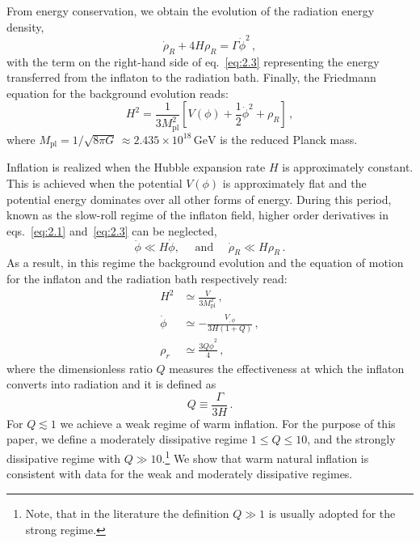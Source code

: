\documentclass[a4paper,11pt]{article}
\begin{document}
From energy conservation, we obtain the evolution of the radiation energy density,
\begin{equation}
    \Dot{\rho}_R+4H\rho_R=\Gamma \Dot{\phi}^2\,,  \label{eq:2.3}
\end{equation}
with the term on the right-hand side of eq.~\eqref{eq:2.3} representing the energy transferred from the inflaton to the radiation bath.
Finally, the Friedmann equation for the background evolution reads:
\begin{equation}
    H^2=\frac{1}{3M_{\mathrm{pl}}^2}\left[V(\phi)+\frac{1}{2}\Dot{\phi}^2+\rho_R\right]\,,  \label{eq:2.4}
\end{equation}
where $M_{\mathrm{pl}} = 1/\sqrt{8 \pi G} \, \approx 2.435\times 10^{18}\,\mathrm{GeV}$ is the reduced Planck mass.

Inflation is realized when the Hubble expansion rate $H$ is approximately constant. This is achieved when the potential $V(\phi)$ is approximately flat and the potential energy dominates over all other forms of energy. During this period, known as the slow-roll regime of the inflaton field, higher order derivatives in eqs.~\eqref{eq:2.1} and~\eqref{eq:2.3} can be neglected,
\begin{equation}
    \ddot{\phi} \ll H \dot{\phi}, \quad \text { and } \quad \dot{\rho}_{R} \ll H \rho_{R}\,. \label{eq:2.5}
\end{equation}
As a result, in this regime the background evolution and the equation of motion for the inflaton and the radiation bath respectively read:
\begin{align}
    H^2&\simeq \frac{V}{3M_{\mathrm{pl}}^2}\,, \label{eq:SR1} \\
    \Dot{\phi}&\simeq -\frac{V_{,\phi}}{3H(1+Q)}\,, \label{eq:SR2}\\
    \rho_r&\simeq \frac{3Q \Dot{\phi}^2}{4}\,,\label{eq:SR3}
\end{align}
where the dimensionless ratio $Q$ measures the effectiveness at which the inflaton converts into radiation and it is defined as
\begin{equation}
    Q \equiv \frac{\Gamma}{3 H}\,.
\end{equation}
For $Q\lesssim 1$ we achieve a weak regime of warm inflation. For the purpose of this paper, we define a moderately dissipative regime $1\leq Q\leq 10$, and the strongly dissipative regime with $Q \gg 10$.\footnote{Note, that in the literature the definition $Q \gg 1$ is usually adopted for the strong regime.} We show that warm natural inflation is consistent with data for the weak and moderately dissipative regimes.
\end{document}

